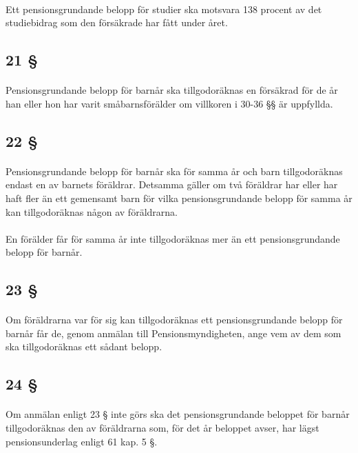\documentclass[a4paper,notitlepage,openany,10pt]{book}
\begin{document}
\paragraph*{}
Ett pensionsgrundande belopp för studier ska motsvara 138 procent av det studiebidrag som den försäkrade har fått under året.
\subsection*{21 §}
\paragraph*{}
Pensionsgrundande belopp för barnår ska tillgodoräknas en försäkrad för de år han eller hon har varit småbarnsförälder om villkoren i 30-36 §§ är uppfyllda.
\subsection*{22 §}
\paragraph*{}
Pensionsgrundande belopp för barnår ska för samma år och barn tillgodoräknas endast en av barnets föräldrar. Detsamma gäller om två föräldrar har eller har haft fler än ett gemensamt barn för vilka pensionsgrundande belopp för samma år kan tillgodoräknas någon av föräldrarna.
\paragraph*{}
En förälder får för samma år inte tillgodoräknas mer än ett pensionsgrundande belopp för barnår.
\subsection*{23 §}
\paragraph*{}
Om föräldrarna var för sig kan tillgodoräknas ett pensionsgrundande belopp för barnår får de, genom anmälan till Pensionsmyndigheten, ange vem av dem som ska tillgodoräknas ett sådant belopp.
\subsection*{24 §}
\paragraph*{}
Om anmälan enligt 23 § inte görs ska det pensionsgrundande beloppet för barnår tillgodoräknas den av föräldrarna som, för det år beloppet avser, har lägst pensionsunderlag enligt 61 kap. 5 §.
\end{document}
